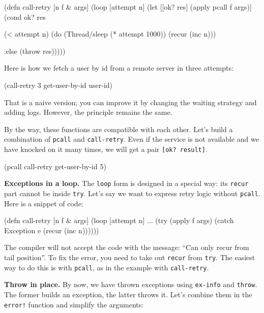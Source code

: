 \else

\begin{clojure}
(defn call-retry [n f & args]
  (loop [attempt n]
    (let [[ok? res] (apply pcall f args)]
      (cond
        ok? res

        (< attempt n)
        (do (Thread/sleep (* attempt 1000))
            (recur (inc n)))

        :else (throw res)))))
\end{clojure}

\fi

Here is how we fetch a user by id from a remote server in three attempts:

\begin{english}
  \begin{clojure}
(call-retry 3 get-user-by-id user-id)
  \end{clojure}
\end{english}

That is a naive version; you can improve it by changing the waiting strategy and adding logs. However, the principle remains the same.

By the way, these functions are compatible with each other. Let's build a combination of \verb|pcall| and \verb|call-retry|. Even if the service is not available and we have knocked on it many times, we will get a pair \verb|[ok? result]|.

\begin{clojure}
(pcall call-retry get-user-by-id 5)
\end{clojure}

\textbf{Exceptions in a loop.} The \verb|loop| form is designed in a special way: its \verb|recur| part cannot be inside \verb|try|. Let's say we want to express retry logic without \verb|pcall|. Here is a snippet of code:


\begin{clojure}
(defn call-retry [n f & args]
  (loop [attempt n]
    ...
    (try
      (apply f args)
      (catch Exception e
        (recur (inc n))))))
\end{clojure}

The compiler will not accept the code with the message: ``Can only recur from tail position''. To fix the error, you need to take out \verb|recur| from \verb|try|. The easiest way to do this is with \verb|pcall|, as in the example with \verb|call-retry|.

\textbf{Throw in place.} By now, we have thrown exceptions using \verb|ex-info| and \verb|throw|. The former builds an exception, the latter throws it. Let's combine them in the \verb|error!| function and simplify the arguments:

